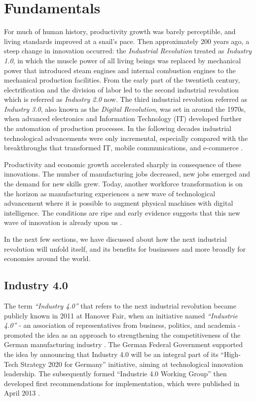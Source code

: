 \chapter{Fundamentals} \label{chap:fundamentals}
For much of human history, productivity growth was barely perceptible, and living standards improved at a snail's pace. Then approximately 200 years ago, a steep change in innovation occurred: the \textit{Industrial Revolution} treated as \textit{Industry 1.0}, in which the muscle power of all living beings was replaced by mechanical power that introduced steam engines and internal combustion engines to the mechanical production facilities. From the early part of the twentieth century, electrification and the division of labor led to the second industrial revolution which is referred as \textit{Industry 2.0} now. The third industrial revolution referred as \textit{Industry 3.0}, also known as the \textit{Digital Revolution}, was set in around the 1970s, when advanced electronics and Information Technology (\acs{IT}) developed further the automation of production processes. In the following decades industrial technological advancements were only incremental, especially compared with the breakthroughs that transformed \acs{IT}, mobile communications, and e-commerce \cite{INDUSINTERNET,IN4DESIGN,IN4BCG}.

Productivity and economic growth accelerated sharply in consequence of these innovations. The number of manufacturing jobs decreased, new jobs emerged and the demand for new skills grew. Today, another workforce transformation is on the horizon as manufacturing experiences a new wave of technological advancement where it is possible to augment physical machines with digital intelligence. The conditions are ripe and early evidence suggests that this new wave of innovation is already upon us \cite{INDUSINTERNET,MANMACHINE}.

In the next few sections, we have discussed about how the next industrial revolution will unfold itself, and its benefits for businesses and more broadly for economies around the world.
\section{Industry 4.0} \label{ind4}
The term \textit{“Industry 4.0”} that refers to the next industrial revolution became publicly known in 2011 at Hanover Fair, when an initiative named \textit{“Industrie 4.0”} - an association of representatives from business, politics, and academia - promoted the idea as an approach to strengthening the competitiveness of the German manufacturing industry \cite{VDINACH}. The German Federal Government supported the idea by announcing that Industry 4.0 will be an integral part of its “High-Tech Strategy 2020 for Germany” initiative, aiming at technological innovation leadership. The subsequently formed “Industrie 4.0 Working Group” then developed first recommendations for implementation, which were published in April 2013 \cite{IN4DESIGN}.

